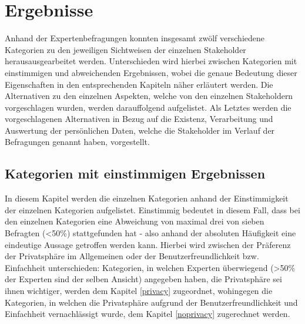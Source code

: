 \chapter{Ergebnisse} %
\label{Results} %
Anhand der Expertenbefragungen konnten insgesamt zwölf verschiedene Kategorien zu den jeweiligen Sichtweisen der einzelnen Stakeholder herausausgearbeitet werden. Unterschieden wird hierbei zwischen Kategorien mit einstimmigen und abweichenden Ergebnissen, wobei die genaue Bedeutung dieser Eigenschaften in den entsprechenden Kapiteln näher erläutert werden.
Die Alternativen zu den einzelnen Aspekten, welche von den einzelnen Stakeholdern vorgeschlagen wurden, werden darauffolgend aufgelistet. Als Letztes werden die vorgeschlagenen Alternativen in Bezug auf die Existenz, Verarbeitung und Auswertung der persönlichen Daten, welche die Stakeholder im Verlauf der Befragungen genannt haben, vorgestellt.

\section{Kategorien mit einstimmigen Ergebnissen} \label{clearresult}
In diesem Kapitel werden die einzelnen Kategorien anhand der Einstimmigkeit der einzelnen Kategorien aufgelistet. Einstimmig bedeutet in diesem Fall, dass bei den einzelnen Kategorien eine Abweichung von maximal drei von sieben Befragten (<50\%) stattgefunden hat - also anhand
der absoluten Häufigkeit eine eindeutige Aussage getroffen werden kann. \newline 
Hierbei wird zwischen der Präferenz der Privatsphäre im Allgemeinen oder der Benutzerfreundlichkeit bzw. Einfachheit unterschieden: Kategorien, in welchen Experten überwiegend
(>50\% der Experten sind der selben Ansicht) angegeben haben, die Privatsphäre sei ihnen wichtiger, werden dem Kapitel \ref{privacy} zugeordnet, wohingegen die Kategorien, in welchen die Privatsphäre
aufgrund der Benutzerfreundlichkeit und Einfachheit vernachlässigt wurde, dem Kapitel \ref{noprivacy} zugerechnet werden.
